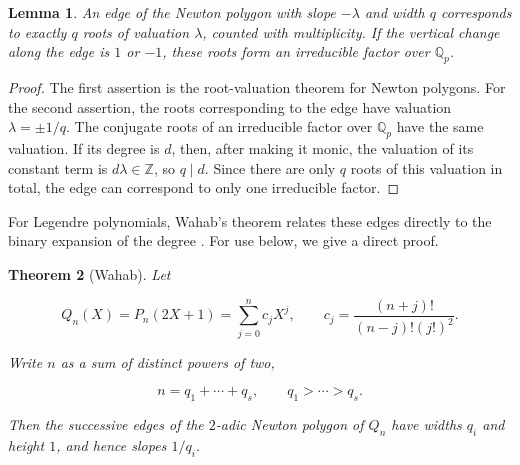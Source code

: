 \documentclass[11pt,a4paper]{article}
\numberwithin{equation}{section}
\newtheorem{theorem}{Theorem}[section]
\newtheorem{lemma}[theorem]{Lemma}
\theoremstyle{definition}
\begin{document}
\begin{lemma}\label{lem:np}
An edge of the Newton polygon with slope \(-\lambda\) and width \(q\) corresponds to exactly \(q\) roots of valuation \(\lambda\), counted with multiplicity. If the vertical change along the edge is \(1\) or \(-1\), these roots form an irreducible factor over \(\mathbb Q_p\).
\end{lemma}

\begin{proof}
The first assertion is the root-valuation theorem for Newton polygons. For the second assertion, the roots corresponding to the edge have valuation \(\lambda=\pm1/q\). The conjugate roots of an irreducible factor over \(\mathbb Q_p\) have the same valuation. If its degree is \(d\), then, after making it monic, the valuation of its constant term is \(d\lambda\in\mathbb Z\), so \(q\mid d\). Since there are only \(q\) roots of this valuation in total, the edge can correspond to only one irreducible factor.
\end{proof}

For Legendre polynomials, Wahab's theorem relates these edges directly to the binary expansion of the degree \cite{wahab,cullinan}. For use below, we give a direct proof.

\begin{theorem}[Wahab]\label{thm:wahab}
Let

\[
Q_n(X)=P_n(2X+1)
=\sum_{j=0}^n c_jX^j,\qquad
c_j=\frac{(n+j)!}{(n-j)!(j!)^2}.
\]

Write \(n\) as a sum of distinct powers of two,

\[
n=q_1+\cdots+q_s,\qquad q_1>\cdots>q_s.
\]

Then the successive edges of the $2$-adic Newton polygon of \(Q_n\) have widths \(q_i\) and height $1$, and hence slopes \(1/q_i\).
\end{theorem}
\end{document}
